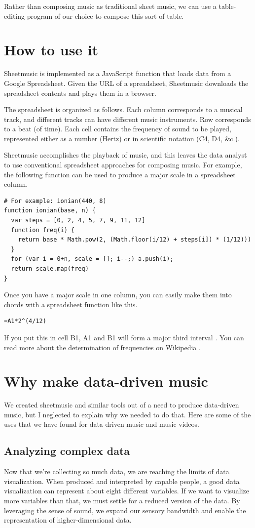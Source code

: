 \documentclass{acm_proc_article-sp}
\begin{document}
Rather than composing music as traditional sheet music,
we can use a table-editing program of our choice to compose
this sort of table.

\section{How to use it}
Sheetmusic is implemented as a JavaScript function that loads data
from a Google Spreadsheet. Given the URL of a spreadsheet, Sheetmusic
downloads the spreadsheet contents and plays them in a browser.

The spreadsheet is organized as follows. Each column corresponds
to a musical track, and different tracks can have different music instruments.
Row corresponds to a beat (of time).
Each cell contains the frequency of sound to be played, represented
either as a number (Hertz) or in scientific notation (C4, D4, \&c.).

Sheetmusic accomplishes the playback of music, and this leaves
the data analyst to use conventional spreadsheet approaches for
composing music. For example, the following function can be used
to produce a major scale in a spreadsheet column.
\begin{verbatim}
# For example: ionian(440, 8)
function ionian(base, n) {
  var steps = [0, 2, 4, 5, 7, 9, 11, 12]
  function freq(i) {
    return base * Math.pow(2, (Math.floor(i/12) + steps[i]) * (1/12)))
  }
  for (var i = 0+n, scale = []; i--;) a.push(i);
  return scale.map(freq)
}
\end{verbatim}
Once you have a major scale in one column, you can easily make them
into chords with a spreadsheet function like this.
\begin{verbatim}
=A1*2^(4/12)
\end{verbatim}
If you put this in cell B1, A1 and B1 will form a major third interval
\cite{majorthird}.
You can read more about the determination of frequencies on Wikipedia \cite{piano}.

\section{Why make data-driven music}
We created sheetmusic and similar tools out of a need to produce
data-driven music, but I neglected to explain why we needed to do
that. Here are some of the uses that we have found for data-driven
music and music videos.

\subsection{Analyzing complex data}
Now that we're collecting so much data, we are reaching the limits of
data visualization. When produced and interpreted by capable people,
a good data visualization can represent about eight different variables.
If we want to visualize more variables than that, we must settle for
a reduced version of the data. By leveraging the sense of sound,
we expand our sensory bandwidth and enable the representation of
higher-dimensional data.
\end{document}
